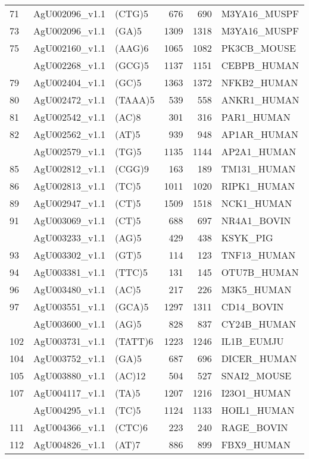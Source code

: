 \documentclass[]{article}
\begin{document}
\begin{longtable}[t]{lllrrl}
71 & AgU002096\_v1.1 & (CTG)5 & 676 & 690 & M3YA16\_MUSPF\\
73 & AgU002096\_v1.1 & (GA)5 & 1309 & 1318 & M3YA16\_MUSPF\\
75 & AgU002160\_v1.1 & (AAG)6 & 1065 & 1082 & PK3CB\_MOUSE\\
\addlinespace
76 & AgU002268\_v1.1 & (GCG)5 & 1137 & 1151 & CEBPB\_HUMAN\\
79 & AgU002404\_v1.1 & (GC)5 & 1363 & 1372 & NFKB2\_HUMAN\\
80 & AgU002472\_v1.1 & (TAAA)5 & 539 & 558 & ANKR1\_HUMAN\\
81 & AgU002542\_v1.1 & (AC)8 & 301 & 316 & PAR1\_HUMAN\\
82 & AgU002562\_v1.1 & (AT)5 & 939 & 948 & AP1AR\_HUMAN\\
\addlinespace
83 & AgU002579\_v1.1 & (TG)5 & 1135 & 1144 & AP2A1\_HUMAN\\
85 & AgU002812\_v1.1 & (CGG)9 & 163 & 189 & TM131\_HUMAN\\
86 & AgU002813\_v1.1 & (TC)5 & 1011 & 1020 & RIPK1\_HUMAN\\
89 & AgU002947\_v1.1 & (CT)5 & 1509 & 1518 & NCK1\_HUMAN\\
91 & AgU003069\_v1.1 & (CT)5 & 688 & 697 & NR4A1\_BOVIN\\
\addlinespace
92 & AgU003233\_v1.1 & (AG)5 & 429 & 438 & KSYK\_PIG\\
93 & AgU003302\_v1.1 & (GT)5 & 114 & 123 & TNF13\_HUMAN\\
94 & AgU003381\_v1.1 & (TTC)5 & 131 & 145 & OTU7B\_HUMAN\\
96 & AgU003480\_v1.1 & (AC)5 & 217 & 226 & M3K5\_HUMAN\\
97 & AgU003551\_v1.1 & (GCA)5 & 1297 & 1311 & CD14\_BOVIN\\
\addlinespace
99 & AgU003600\_v1.1 & (AG)5 & 828 & 837 & CY24B\_HUMAN\\
102 & AgU003731\_v1.1 & (TATT)6 & 1223 & 1246 & IL1B\_EUMJU\\
104 & AgU003752\_v1.1 & (GA)5 & 687 & 696 & DICER\_HUMAN\\
105 & AgU003880\_v1.1 & (AC)12 & 504 & 527 & SNAI2\_MOUSE\\
107 & AgU004117\_v1.1 & (TA)5 & 1207 & 1216 & I23O1\_HUMAN\\
\addlinespace
110 & AgU004295\_v1.1 & (TC)5 & 1124 & 1133 & HOIL1\_HUMAN\\
111 & AgU004366\_v1.1 & (CTC)6 & 223 & 240 & RAGE\_BOVIN\\
112 & AgU004826\_v1.1 & (AT)7 & 886 & 899 & FBX9\_HUMAN\\

\end{longtable}
\end{document}
